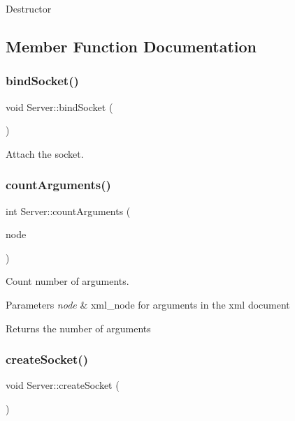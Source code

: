 Destructor 

\subsection{Member Function Documentation}
\mbox{\label{classServer_a8d86edf1df9f12df07dc6e949d70f77f}} 
\subsubsection{\texorpdfstring{bind\+Socket()}{bindSocket()}}
{\footnotesize\ttfamily void Server\+::bind\+Socket (\begin{DoxyParamCaption}{ }\end{DoxyParamCaption})\hspace{0.3cm}{\ttfamily [private]}}

Attach the socket. \mbox{\label{classServer_ad5472ee30f2eb795c29432d3cc7dac15}} 
\subsubsection{\texorpdfstring{count\+Arguments()}{countArguments()}}
{\footnotesize\ttfamily int Server\+::count\+Arguments (\begin{DoxyParamCaption}\item[{xml\+\_\+node}]{node }\end{DoxyParamCaption})\hspace{0.3cm}{\ttfamily [private]}}

Count number of arguments. 
\begin{DoxyParams}{Parameters}
{\em node} & xml\+\_\+node for arguments in the xml document \\
\hline
\end{DoxyParams}
\begin{DoxyReturn}{Returns}
the number of arguments 
\end{DoxyReturn}
\mbox{\label{classServer_afa110e18047a3345bca72ed32ca3ce95}} 
\subsubsection{\texorpdfstring{create\+Socket()}{createSocket()}}
{\footnotesize\ttfamily void Server\+::create\+Socket (\begin{DoxyParamCaption}{ }\end{DoxyParamCaption})\hspace{0.3cm}{\ttfamily [private]}}

